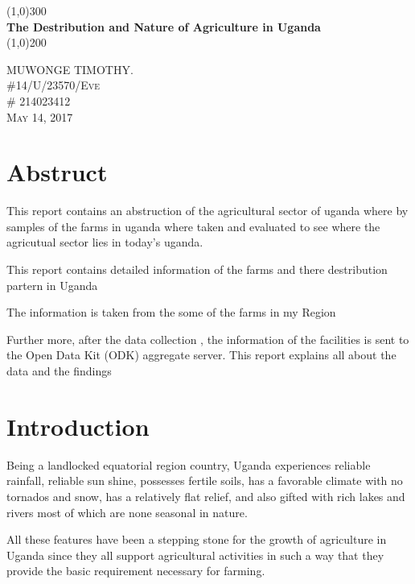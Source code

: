 \documentclass{article}
\begin{document}
\begin{titlepage}
	\begin{center}
	\line(1,0){300}\\
	[0.25inc]
	\huge{\bfseries The Destribution and Nature of Agriculture in Uganda}\\
	[2mm]
	\line(1,0){200}\\
	[1.5cm]
	\end{center}

	\begin{flushright}
	\textsc{\large MUWONGE TIMOTHY.\\
	\#14/U/23570/Eve \\
	\# 214023412\\
	May 14, 2017\\}
	\end{flushright}
\end{titlepage}
\cleardoublepage

\tableofcontents
\thispagestyle{empty}
\cleardoublepage
{}
\setcounter{page}{1}

\section{Abstruct}

This report contains an abstruction of the agricultural sector of uganda where by samples of the farms in uganda where taken and evaluated to see where the agricutual sector lies in today's uganda.

This report contains detailed information of the farms and there destribution partern in Uganda

The information is taken from the some of the farms in my Region

Further more, after the data collection , the information of the facilities is sent to the Open Data Kit (ODK) aggregate server. This report explains all about the data and the findings
\section{Introduction}

Being a landlocked equatorial region country, Uganda experiences reliable rainfall, reliable sun shine, possesses fertile soils, has a favorable climate with no tornados and snow, has a relatively flat relief, and also gifted with rich lakes and rivers most of which are none seasonal in nature. 

All these features have been a stepping stone for the growth of agriculture in Uganda since they all support agricultural activities in such a way that they provide the basic requirement necessary for farming.
\end{document}
